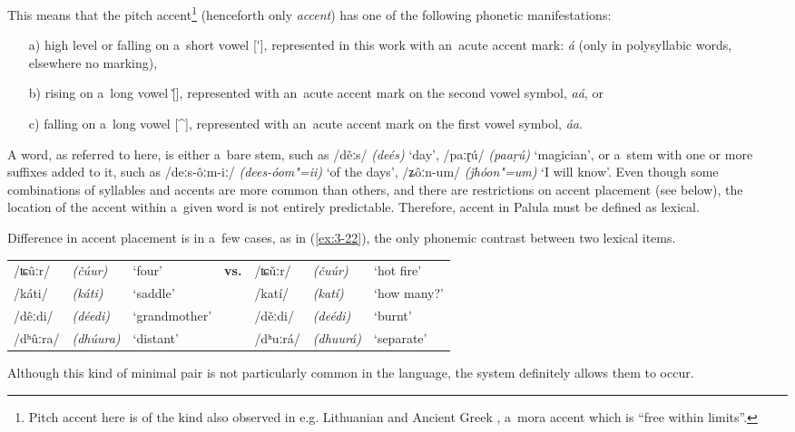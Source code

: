 This means that the pitch accent\footnote{Pitch accent here is of the kind also observed in e.g. Lithuanian and Ancient Greek \citep[73--82]{szemerenyi1996}, a~mora accent which is ``free within limits''.} (henceforth only \textit{accent}) has one of the following phonetic manifestations:
\begin{enumerate}
\item[a)] high level or falling on a~short vowel [\'{}], represented in this work with an~acute accent mark: \textit{á} (only in polysyllabic words, elsewhere no marking), 
\item[b)] rising on a~long vowel [\v{}], represented with an~acute accent mark on the second vowel symbol, \textit{aá}, or 
\item[c)] falling on a~long vowel [\^{}], represented with an~acute accent mark on the first vowel symbol, \textit{áa}.
\end{enumerate}
A word, as referred to here, is either a~bare stem, such as /děːs/ \textit{(deés)} `day', /paːɽú/ \textit{(paaṛú)} `magician', or a~stem with one or more suffixes added to it, such as /deːs-ôːm-iː/ \textit{(dees-óom"=ii)} `of the days', /ʑôːn-um/ \textit{(ǰhóon"=um)} `I will know'. Even though some combinations of syllables and accents are more common than others, and there are restrictions on accent placement (see below), the location of the accent within a~given word is not entirely predictable. Therefore, accent in Palula must be defined as lexical. 


Difference in accent placement is in a~few cases, as in (\ref{ex:3-22}), the only phonemic contrast between two lexical items.


\begin{exe}
\extab
\label{ex:3-22}
\begin{tabularx}{116mm}{ l l Q l l l Q }
/ʨûːr/ &
\textit{(čúur)} &
`four' &
\textbf{vs.} &
/ʨǔːr/ &
\textit{(čuúr)} &
`hot fire'\\
/káti/ &
\textit{(káti)} &
`saddle' &
&
/katí/ &
\textit{(katí)} &
`how many?'\\
/dêːdi/ &
\textit{(déedi)} &
`grand\-mother' &
&
/děːdi/ &
\textit{(deédi)} &
`burnt'\\
/dʰûːra/ &
\textit{(dhúura)} &
`distant' &
&
/dʰuːrá/ &
\textit{(dhuurá)} &
`separate'\\
\end{tabularx}
\end{exe}

Although this kind of minimal pair is not particularly common in the language, the system definitely allows them to occur.

